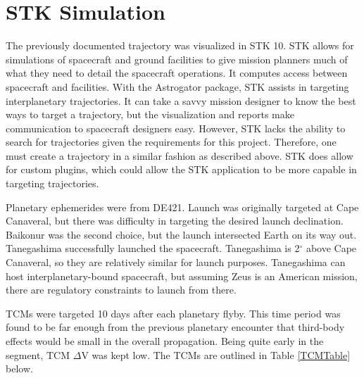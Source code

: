 \documentclass[]{aiaa-tc}%
\begin{document}
	\section{STK Simulation}
The previously documented trajectory was visualized in STK 10. STK allows for simulations of spacecraft and ground facilities to give mission planners much of what they need to detail the spacecraft operations. It computes access between spacecraft and facilities. With the Astrogator package, STK assists in targeting interplanetary trajectories. It can take a savvy mission designer to know the best ways to target a trajectory, but the visualization and reports make communication to spacecraft designers easy. However, STK lacks the ability to search for trajectories given the requirements for this project. Therefore, one must create a trajectory in a similar fashion as described above. STK does allow for custom plugins, which could allow the STK application to be more capable in targeting trajectories. 
	
	\vspace{5 mm}

Planetary ephemerides were from DE421. Launch was originally targeted at Cape Canaveral, but there was difficulty in targeting the desired launch declination. Baikonur was the second choice, but the launch intersected Earth on its way out. Tanegashima successfully launched the spacecraft. Tanegashima is 2$^\circ$ above Cape Canaveral, so they are relatively similar for launch purposes.  Tanegashima can host interplanetary-bound spacecraft, but assuming Zeus is an American mission, there are regulatory constraints to launch from there.
	
	\vspace{5 mm}

TCMs were targeted 10 days after each planetary flyby. This time period was found to be far enough from the previous planetary encounter that third-body effects would be small in the overall propagation. Being quite early in the segment, TCM $\Delta$V was kept low. The TCMs are outlined in Table \ref{TCMTable} below.
\end{document}
